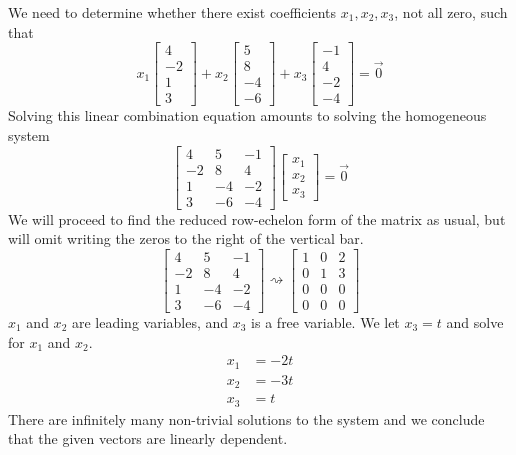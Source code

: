 \documentclass{ximera}
\begin{document}
\begin{example}
\begin{explanation}\label{ex:homogeneouslinind} We need to determine whether there exist coefficients $x_1, x_2, x_3$, not all zero, such that 
$$x_1\begin{bmatrix}4\\-2\\1\\3\end{bmatrix}+ x_2\begin{bmatrix}5\\8\\-4\\-6\end{bmatrix}+ x_3\begin{bmatrix}-1\\4\\-2\\-4\end{bmatrix}=\vec{0}$$
Solving this linear combination equation amounts to solving the homogeneous system
$$\begin{bmatrix}4&5&-1\\-2&8&4\\1&-4&-2\\3&-6&-4\end{bmatrix}\begin{bmatrix}x_1\\x_2\\x_3\end{bmatrix}=\vec{0}$$
We will proceed to find the reduced row-echelon form of the matrix as usual, but will omit writing the zeros to the right of the vertical bar.
$$\begin{bmatrix}4&5&-1\\-2&8&4\\1&-4&-2\\3&-6&-4\end{bmatrix}\rightsquigarrow \begin{bmatrix}1&0&2\\0&1&3\\0&0&0\\0&0&0\end{bmatrix}$$
$x_1$ and $x_2$ are leading variables, and $x_3$ is a free variable.  We let $x_3=t$ and solve for $x_1$ and $x_2$.
\begin{align*}x_1&=-2t\\
x_2&=-3t\\
x_3&=t
\end{align*}
There are infinitely many non-trivial solutions to the system and we conclude that the given vectors are linearly dependent.
\end{explanation}
\end{example}
\end{document}
